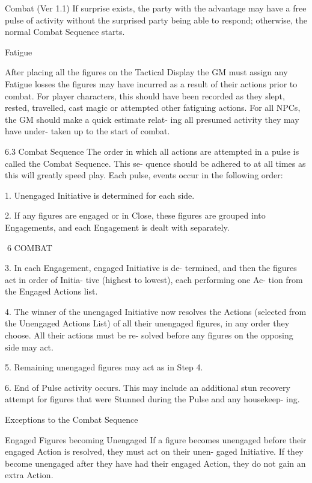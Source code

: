 \begin{Chapter}{Combat (Ver 1.1)}
If surprise exists, the party with the advantage may 
have  a  free  pulse  of  activity  without  the  surprised 
party being able to respond; otherwise, the normal 
Combat Sequence starts. 

Fatigue 

After placing all the figures on the Tactical Display 
the GM must assign any Fatigue losses the figures 
may have incurred as a result of their actions prior 
to  combat.  For  player  characters,  this  should  have 
been  recorded  as  they  slept,  rested,  travelled,  cast 
magic or attempted other fatiguing actions. For all 
NPCs, the GM should make a quick estimate relat-
ing  all  presumed  activity  they  may  have  under-
taken up to the start of combat. 

6.3 Combat Sequence 
The  order  in  which  all  actions  are  attempted  in  a 
pulse  is  called  the  Combat  Sequence.  This  se-
quence should be adhered to at all times as this will 
greatly speed play. Each pulse, events occur in the 
following order: 

1.  Unengaged  Initiative  is  determined  for  each 
side. 

2.  If  any  figures  are  engaged  or  in  Close,  these 
figures  are  grouped  into  Engagements,  and  each 
Engagement is dealt with separately. 

6 COMBAT 

3.  In  each  Engagement,  engaged  Initiative  is  de-
termined, and then the figures act in order of Initia-
tive  (highest  to  lowest),  each  performing  one  Ac-
tion from the Engaged Actions list. 

4.  The  winner  of  the  unengaged  Initiative  now 
resolves the Actions (selected from the Unengaged 
Actions List) of all their unengaged figures, in any 
order  they  choose.  All  their  actions  must  be  re-
solved before any figures on the opposing side may 
act. 

5. Remaining unengaged figures may act as in Step 
4. 

6.  End  of  Pulse  activity  occurs.  This  may  include 
an additional stun recovery attempt for figures that 
were Stunned during the Pulse and any housekeep-
ing. 

Exceptions to the Combat Sequence 

Engaged  Figures  becoming  Unengaged  If  a 
figure  becomes  unengaged  before  their  engaged 
Action  is  resolved,  they  must  act  on  their  unen-
gaged  Initiative.  If  they  become  unengaged  after 
they  have  had  their  engaged  Action,  they  do  not 
gain an extra Action. 


\end{Chapter}
